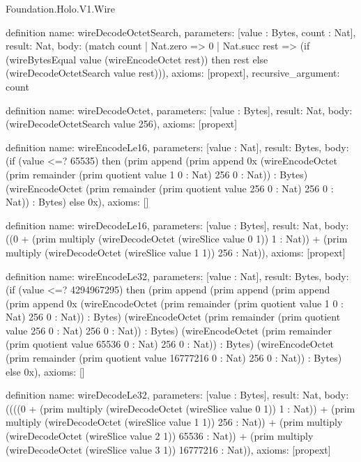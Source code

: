 \begin{lexlean}{Foundation.Holo.V1.Wire}
\begin{semanticmodule}
definition{
  name: wireDecodeOctetSearch,
  parameters: [value : Bytes, count : Nat],
  result: Nat,
  body: (match count
    | Nat.zero => 0
    | Nat.succ rest => (if (wireBytesEqual value (wireEncodeOctet rest)) then rest else (wireDecodeOctetSearch value rest))),
  axioms: [propext],
  recursive_argument: count
}

definition{
  name: wireDecodeOctet,
  parameters: [value : Bytes],
  result: Nat,
  body: (wireDecodeOctetSearch value 256),
  axioms: [propext]
}

definition{
  name: wireEncodeLe16,
  parameters: [value : Nat],
  result: Bytes,
  body: (if (value <=? 65535) then (prim append (prim append 0x (wireEncodeOctet (prim remainder (prim quotient value 1 0 : Nat) 256 0 : Nat)) : Bytes) (wireEncodeOctet (prim remainder (prim quotient value 256 0 : Nat) 256 0 : Nat)) : Bytes) else 0x),
  axioms: []
}

definition{
  name: wireDecodeLe16,
  parameters: [value : Bytes],
  result: Nat,
  body: ((0 + (prim multiply (wireDecodeOctet (wireSlice value 0 1)) 1 : Nat)) + (prim multiply (wireDecodeOctet (wireSlice value 1 1)) 256 : Nat)),
  axioms: [propext]
}

definition{
  name: wireEncodeLe32,
  parameters: [value : Nat],
  result: Bytes,
  body: (if (value <=? 4294967295) then (prim append (prim append (prim append (prim append 0x (wireEncodeOctet (prim remainder (prim quotient value 1 0 : Nat) 256 0 : Nat)) : Bytes) (wireEncodeOctet (prim remainder (prim quotient value 256 0 : Nat) 256 0 : Nat)) : Bytes) (wireEncodeOctet (prim remainder (prim quotient value 65536 0 : Nat) 256 0 : Nat)) : Bytes) (wireEncodeOctet (prim remainder (prim quotient value 16777216 0 : Nat) 256 0 : Nat)) : Bytes) else 0x),
  axioms: []
}

definition{
  name: wireDecodeLe32,
  parameters: [value : Bytes],
  result: Nat,
  body: ((((0 + (prim multiply (wireDecodeOctet (wireSlice value 0 1)) 1 : Nat)) + (prim multiply (wireDecodeOctet (wireSlice value 1 1)) 256 : Nat)) + (prim multiply (wireDecodeOctet (wireSlice value 2 1)) 65536 : Nat)) + (prim multiply (wireDecodeOctet (wireSlice value 3 1)) 16777216 : Nat)),
  axioms: [propext]
}


\end{semanticmodule}
\end{lexlean}
